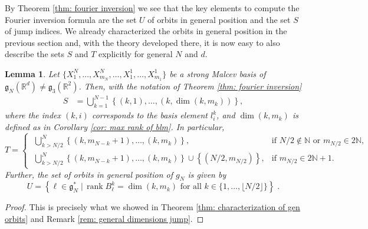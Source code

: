 \documentclass[pdflatex,sn-mathphys-num]{sn-jnl}
\theoremstyle{thmstyletwo}
\theoremstyle{thmstyleone}
\newtheorem{lemma}[definition]{Lemma}
\theoremstyle{thmstyletwo}
\newcommand{\fancyg}{\mathfrak{g}}
\newcommand{\R}{\mathbb{R}}
\begin{document}
		By Theorem \ref{thm: fourier inversion} we see that the key elements to compute the Fourier inversion formula are the set $U$ of orbits in general position and the set $S$ of jump indices. We already characterized the orbits in general position in the previous section and, with the theory developed there, it is now easy to also describe the sets $S$ and $T$ explicitly for general $N$ and $d$.
		\begin{lemma}\label{lem: S and T}
			Let $\{X_{1}^N, \ldots, X_{m_{N}}^N, \ldots, X_1^1, \ldots, X_{m_1}^1\}$ be a strong Malcev basis of $\fancyg_N({\mathbb{R}^d}) \neq \fancyg_3(\R^2)$. Then, with the notation of Theorem \ref{thm: fourier inversion}
			\begin{align*}
				S &=\bigcup_{k=1}^{N-1}\left\{(k,1), \ldots, (k,\dim(k,m_k))\right\},
			\end{align*}
			where the index $(k,i)$ corresponds to the basis element $l_i^k$, and $\dim(k,m_k)$ is defined as in Corollary \ref{cor: max rank of blm}.
			In particular, 
			\begin{equation*}
				T = 
                \begin{cases}
                \;\displaystyle\bigcup_{k > N/2}^N \left\{(k, m_{N-k}+1), \ldots, (k, m_k)\right\}, 
                & \text{if } N/2 \notin \mathbb{N} \text{ or } m_{N/2} \in 2\mathbb{N}, \\[1.5ex]
                \;\displaystyle\bigcup_{k > N/2}^N \left\{(k, m_{N-k}+1), \ldots, (k, m_k)\right\} \cup \left\{(N/2, m_{N/2})\right\}, 
                & \text{if } m_{N/2} \in 2\mathbb{N} + 1.
                \end{cases}
			\end{equation*}
			Further, the set of orbits in general position of $g_N$ is given by
			\[U = \left\{\ell \in \fancyg_{N}^* \;|\, \operatorname{rank} B_{\ell}^k = \dim(k,m_k) \text{ for all } k \in \{1, \ldots,\lfloor N/2\rfloor\}\right\}\;.\]
		\end{lemma}
		\begin{proof}
			This is precisely what we showed in Theorem \ref{thm: characterization of gen orbits} and Remark \ref{rem: general dimensions jump}.
		\end{proof}
\end{document}
